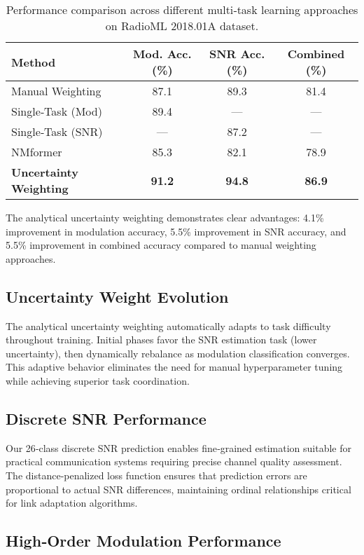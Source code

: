 \documentclass{ELSP}
\begin{document}
\begin{table}[H]
\centering
\begin{tabular}{lccc}
\toprule
\textbf{Method} & \textbf{Mod. Acc. (\%)} & \textbf{SNR Acc. (\%)} & \textbf{Combined (\%)} \\
\midrule
Manual Weighting & 87.1 & 89.3 & 81.4 \\
Single‑Task (Mod) & 89.4 & — & — \\
Single‑Task (SNR) & — & 87.2 & — \\
NMformer \cite{kong2023nmformer} & 85.3 & 82.1 & 78.9 \\
\textbf{Uncertainty Weighting} & \textbf{91.2} & \textbf{94.8} & \textbf{86.9} \\
\bottomrule
\end{tabular}
\caption{Performance comparison across different multi‑task learning approaches on RadioML 2018.01A dataset.}
\label{tab:performance}
\end{table}

The analytical uncertainty weighting demonstrates clear advantages: 4.1\% improvement in modulation accuracy, 5.5\% improvement in SNR accuracy, and 5.5\% improvement in combined accuracy compared to manual weighting approaches.

\subsection{Uncertainty Weight Evolution}

The analytical uncertainty weighting automatically adapts to task difficulty throughout training. Initial phases favor the SNR estimation task (lower uncertainty), then dynamically rebalance as modulation classification converges. This adaptive behavior eliminates the need for manual hyperparameter tuning while achieving superior task coordination.

\subsection{Discrete SNR Performance}

Our 26‑class discrete SNR prediction enables fine‑grained estimation suitable for practical communication systems requiring precise channel quality assessment. The distance‑penalized loss function ensures that prediction errors are proportional to actual SNR differences, maintaining ordinal relationships critical for link adaptation algorithms.

\subsection{High‑Order Modulation Performance}
\end{document}
